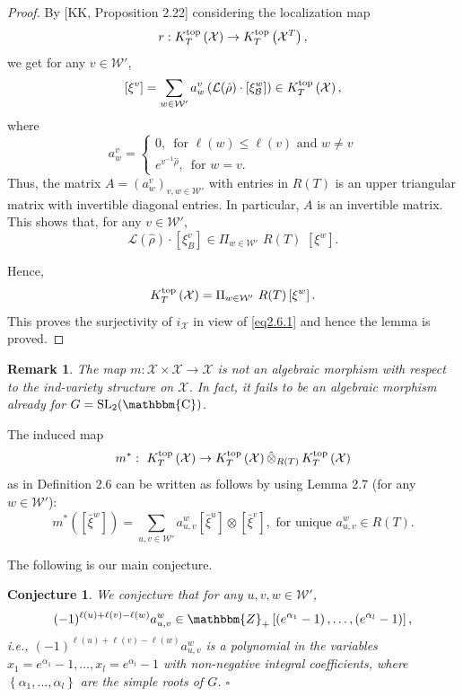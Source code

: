 \documentclass{article}
\newtheorem{remark}[theorem]{Remark}
\newtheorem{conjecture}[theorem]{Conjecture}
\def\L{\mathcal{L}}
\def\X{\mathcal{X}}
\def\B{\mathcal{B}}
\def\W{\mathcal{W}}
\def\mathbb{\mathbbm}
\def\cite#1{#1}
\def\ref#1{#1}
\def\top{\rm{top}}
\def\SL{\rm{SL}}
\begin{document}
\begin{proof}
By [\cite{KK}, Proposition 2.22] considering the localization map 
$$
r: K_T^{\top}\left(\X\right) \rightarrow K_T^{\top} \left(\X^T\right),
$$
we get for any $v\in \W'$, 
$$
\left[\xi^v\right] = \sum_{ w\in \W'} a^v_w \left( \L (\hat{\rho})\cdot\left [\xi_\B^w\right]\right) \in K_T^{\top}\left(\X\right), 
$$
where
$$a^v_w=
\left\{ \begin{array}{l}
0,\,\,\,\mbox {for} \,\,\ell(w)\leq \ell(v)\mbox{ and }w\neq v 
\\
e^{v^{-1}\hat{\rho}}, \,\,\,\mbox {for} \,\, w = v.
\end{array}\right.
$$
Thus, the matrix $A=\left(a^v_w\right)_{v, w\in \W'}$ with entries in $R(T)$ is an upper triangular matrix with invertible diagonal entries. In particular, $A$ is an invertible matrix. 
This shows that, for any $v\in\W'$, 
$$
\L\left(\hat{\rho}\right)\cdot \left[\xi^v_B\right] \in \Pi_{w\in \W'}\,\,R(T) \,\,\left[\xi^w\right]. 
$$

Hence,
$$K_T^{\top}\left(\X\right)=\Pi_{w\in\W'}\,\,R(T)\left[\xi^w\right].$$
 This proves the surjectivity of $i_{\X}$ in view of \eqref{eq2.6.1} and hence the lemma is proved. 
\end{proof}

\begin{remark}\label{2.8}\rm{
The map $m:\X\times \X \rightarrow \X$ is {\it not} an algebraic morphism with respect to the ind-variety structure on $\X$. In fact, it fails to be an algebraic morphism already for $G=\SL_2(\mathbb{C})$. }
\end{remark}

The induced map 
$$
m^*:~ K_T^{\top}\left(\X\right) \rightarrow K_T^{\top} \left(\X\right)  {\hat{\otimes}}_{R(T)}\, K_T^{\top} \left(\X\right)
$$
as in Definition \ref{2.6} can be written as follows by using Lemma \ref{2.7} (for any $w\in\W'$):
$$
m^*\left(\left[\bar{\xi}^w\right]\right) = \sum_{u,v\in \W'} a^w _{u,v}\left[\bar{\xi}^u\right] \otimes\left [\bar{\xi}^v\right],\mbox{ for unique } a^w_{u,v}\in R(T).
$$


The following is our main conjecture. 

\begin{conjecture}\label{2.9}
We conjecture that for any $u,v,w\in\W'$, 
$$
(-1)^{\ell(u)+\ell(v)-\ell(w)} a^w_{u,v}\in \mathbb{Z}_+\left[\left(e^{\alpha_1}-1\right), \ldots , \left(e^{\alpha_l}-1\right)\right],
$$
 i.e., $(-1)^{\ell(u)+\ell(v)-\ell(w)} a^w_{u,v}$ is a polynomial in the variables $x_1=e^{\alpha_1}-1,\ldots,x_l=e^{\alpha_l}-1$ with non-negative integral coefficients, where $\left\{\alpha_1,\ldots,\alpha_l\right\}$ are the simple roots of $G$. 
   $\square$
\end{conjecture}
\end{document}
